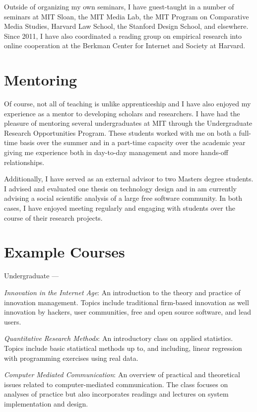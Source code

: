 \documentclass[10pt]{memoir}
\newenvironment{enumerate*}%
  {\begin{enumerate}%
    \setlength{\itemsep}{0pt}%
    \setlength{\parskip}{0pt}}%
  {\end{enumerate}}
\begin{document}
Outside of organizing my own seminars, I have guest-taught in a number
of seminars at MIT Sloan, the MIT Media Lab, the MIT Program on
Comparative Media Studies, Harvard Law School, the Stanford Design
School, and elsewhere. Since 2011, I have also coordinated a reading
group on empirical research into online cooperation at the Berkman
Center for Internet and Society at Harvard.

\section{Mentoring}

Of course, not all of teaching is unlike apprenticeship and I have
also enjoyed my experience as a mentor to developing scholars and
researchers. I have had the pleasure of mentoring several
undergraduates at MIT through the Undergraduate Research Opportunities
Program. These students worked with me on both a full-time basis over
the summer and in a part-time capacity over the academic year giving
me experience both in day-to-day management and more hands-off
relationships.

Additionally, I have served as an external advisor to two Masters
degree students. I advised and evaluated one thesis on technology
design and in am currently advising a social scientific analysis of a
large free software community. In both cases, I have enjoyed meeting
regularly and engaging with students over the course of their research
projects.

\section{Example Courses}

Undergraduate ---

\begin{enumerate*}
\item \emph{Innovation in the Internet Age}: An introduction to the
  theory and practice of innovation management. Topics include
  traditional firm-based innovation as well innovation by hackers,
  user communities, free and open source software, and lead users.
\item \emph{Quantitative Research Methods}: An introductory class on
  applied statistics. Topics include basic statistical methods up to,
  and including, linear regression with programming exercises using
  real data.
\item \emph{Computer Mediated Communication}: An overview of practical
  and theoretical issues related to computer-mediated
  communication. The class focuses on analyses of practice but also
  incorporates readings and lectures on system implementation and
  design.
\end{enumerate*}
\end{document}
